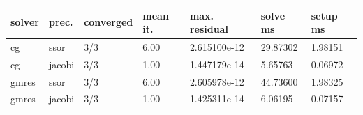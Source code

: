 \begin{center}\small
\begin{tabular}{lllllll}
\toprule
solver & prec. & converged & mean it. & max. residual & solve ms & setup ms\\
\midrule
cg & ssor & 3/3 & 6.00 & 2.615100e-12 & 29.87302 & 1.98151\\
cg & jacobi & 3/3 & 1.00 & 1.447179e-14 & 5.65763 & 0.06972\\
gmres & ssor & 3/3 & 6.00 & 2.605978e-12 & 44.73600 & 1.98325\\
gmres & jacobi & 3/3 & 1.00 & 1.425311e-14 & 6.06195 & 0.07157\\
\bottomrule
\end{tabular}\end{center}
